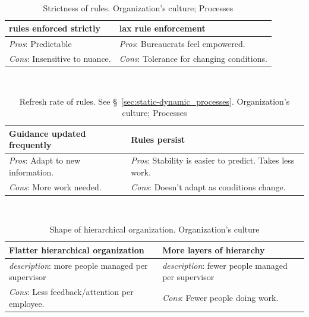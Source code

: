 \ \\

\begin{center}
\begin{table}[ht]
\begin{tabular}{ | m{\dilemmatablewidth}| m{\dilemmatablewidth} | } 
  \hline
  \textbf{rules enforced strictly} & 
  \textbf{lax rule enforcement} \\ 
  \hline
  \textit{Pros}: Predictable &
  \textit{Pros}: Bureaucrats feel empowered. \\
  \hline
  \textit{Cons}: Insensitive to nuance. & 
  \textit{Cons}: Tolerance for changing conditions.  \\  
  \hline
\end{tabular}
\caption{Strictness of rules.
{\tiny Organization's culture; Processes}
}
\end{table}
\end{center}

\ \\

\begin{center}
\begin{table}[ht]
\begin{tabular}{ | m{\dilemmatablewidth}| m{\dilemmatablewidth} | } 
  \hline
  \textbf{Guidance updated frequently} & 
  \textbf{Rules persist} \\ 
  \hline
  \textit{Pros}: Adapt to new information. &
  \textit{Pros}: Stability is easier to predict. Takes less work. \\
  \hline
  \textit{Cons}: More work needed. & 
  \textit{Cons}: Doesn't adapt as conditions change. \\  
  \hline
\end{tabular}
\caption{Refresh rate of rules. See \S~\ref{sec:static-dynamic_processes}.
{\tiny Organization's culture; Processes}
}
\end{table}
\end{center}

\ \\

\begin{center}
\begin{table}[ht]
\begin{tabular}{ | m{\dilemmatablewidth}| m{\dilemmatablewidth} | } 
  \hline
  \textbf{Flatter hierarchical organization} & \textbf{More layers of hierarchy} \\ 
  \hline
  \textit{description}: more people managed per supervisor & 
  \textit{description}: fewer people managed per supervisor \\ 
  \hline
  \textit{Cons}: Less feedback/attention per employee. & 
  \textit{Cons}: Fewer people doing work. \\  
  \hline
\end{tabular}
\caption{Shape of hierarchical organization.
{\tiny Organization's culture}
}
\end{table}
\end{center}

